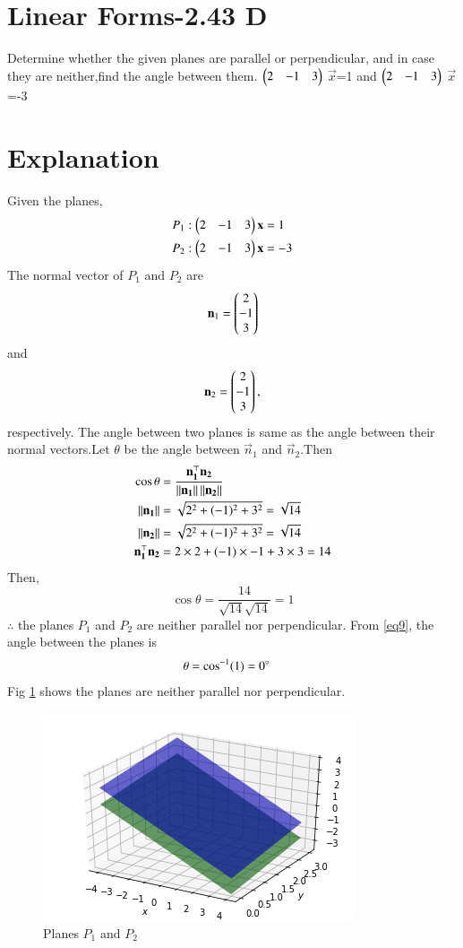 \documentclass[journal,12pt,twocolumn]{IEEEtran}
\begin{document}
\section{Linear Forms-2.43 D}
Determine whether the given planes are parallel or perpendicular, and in case they are neither,find the angle between them.
$\begin{pmatrix}2&-1&3\end{pmatrix}$ $\vec x$=1  and $\begin{pmatrix}2&-1&3\end{pmatrix}$ $\vec{x}$=-3
\section{Explanation}
Given the planes,
\begin{align}
P_1:\begin{pmatrix}2&-1&3\end{pmatrix}\mathbf{x}&=1 \\
P_2 :\begin{pmatrix}2&-1&3\end{pmatrix} \mathbf{x}&=-3
\end{align}
The normal vector of $P_1$ and $P_2$ are 
\begin{equation}
 \mathbf n_1=\begin{pmatrix}2\\-1\\3\end{pmatrix} \end{equation}and
 \begin{equation}
 \mathbf n_2 =\begin{pmatrix}2\\-1\\3\end{pmatrix},
\end{equation} respectively.
The angle between two planes is same as the angle between their normal vectors.Let $\theta$ be the angle between $\vec n_1$ and $\vec n_2$.Then
\begin{align}
    \cos\theta &= \frac{\mathbf{n_1^\top}\mathbf{n_2}}{\left\lVert\mathbf{n_1}\right\rVert\left\lVert\mathbf{n_2}\right\rVert}\\
    \left\lVert\mathbf{n_1}\right\rVert&=\sqrt{2^2+(-1)^2+3^2}=\sqrt{14}\\
    \left\lVert\mathbf{n_2}\right\rVert&=\sqrt{2^2+(-1)^2+3^2}=\sqrt{14}\\
   \mathbf{n_1^\top}\mathbf{n_2}&=2\times2+(-1)\times{-1}+3\times3=14
\end{align}
Then,\begin{equation}
\label{eq9}
    \cos{\theta}=\frac{14}{\sqrt{14}\sqrt{14}}=1
\end{equation} 
$\therefore$ the planes $P_1$ and $P_2$ are neither parallel nor perpendicular.
From \eqref{eq9}, the angle between the planes is
\begin{align}
   \theta &=\cos^{-1}(1)=0\degree
\end{align}
Fig \ref{fig:1} shows the planes are neither parallel nor perpendicular.
\begin{figure}[!ht]
\centering
    \includegraphics[width= \columnwidth]{figure4.png}
    \caption{Planes $P_1$ and $P_2$} \label{fig:1}
\end{figure}
\end{document}

